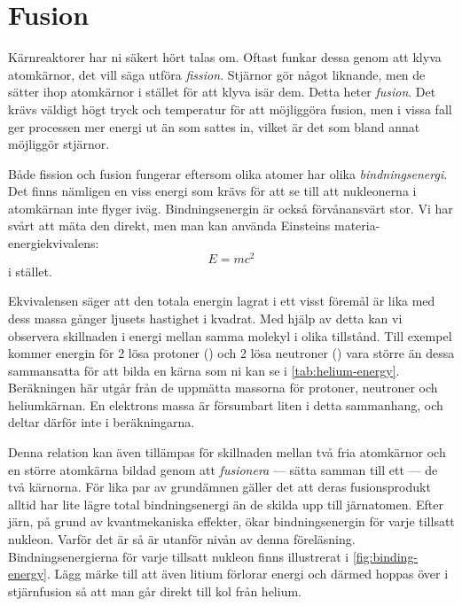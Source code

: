 \section{Fusion}
Kärnreaktorer har ni säkert hört talas om. Oftast funkar dessa genom att klyva atomkärnor, det vill säga utföra \emph{fission}. Stjärnor gör något liknande, men de sätter ihop atomkärnor i stället för att klyva isär dem. Detta heter \emph{fusion}. Det krävs väldigt högt tryck och temperatur för att möjliggöra fusion, men i vissa fall ger processen mer energi ut än som sattes in, vilket är det som bland annat möjliggör stjärnor.

Både fission och fusion fungerar eftersom olika atomer har olika \emph{bindningsenergi}. Det finns nämligen en viss energi som krävs för att se till att nukleonerna i atomkärnan inte flyger iväg. Bindningsenergin är också förvånansvärt stor. Vi har svårt att mäta den direkt, men man kan använda Einsteins materia-energiekvivalens:
\begin{equation}
    E = mc^2
    \label{eq:emc2}
\end{equation}
i stället.

Ekvivalensen säger att den totala energin lagrat i ett visst föremål är lika med dess massa gånger ljusets hastighet i kvadrat. Med hjälp av detta kan vi observera skillnaden i energi mellan samma molekyl i olika tillstånd. Till exempel kommer energin för 2 lösa protoner () och 2 lösa neutroner () vara större än dessa sammansatta för att bilda en  kärna som ni kan se i \cref{tab:helium-energy}. Beräkningen här utgår från de uppmätta massorna för protoner, neutroner och heliumkärnan. En elektrons massa är försumbart liten i detta sammanhang, och deltar därför inte i beräkningarna.

Denna relation kan även tillämpas för skillnaden mellan två fria atomkärnor och en större atomkärna bildad genom att \emph{fusionera} --- sätta samman till ett --- de två kärnorna. För lika par av grundämnen gäller det att deras fusionsprodukt alltid har lite lägre total bindningsenergi än de skilda upp till järnatomen. Efter järn, på grund av kvantmekaniska effekter, ökar bindningsenergin för varje tillsatt nukleon. Varför det är så är utanför nivån av denna föreläsning. Bindningsenergierna för varje tillsatt nukleon finns illustrerat i \cref{fig:binding-energy}. Lägg märke till att även litium förlorar energi och därmed hoppas över i stjärnfusion så att man går direkt till kol från helium.

